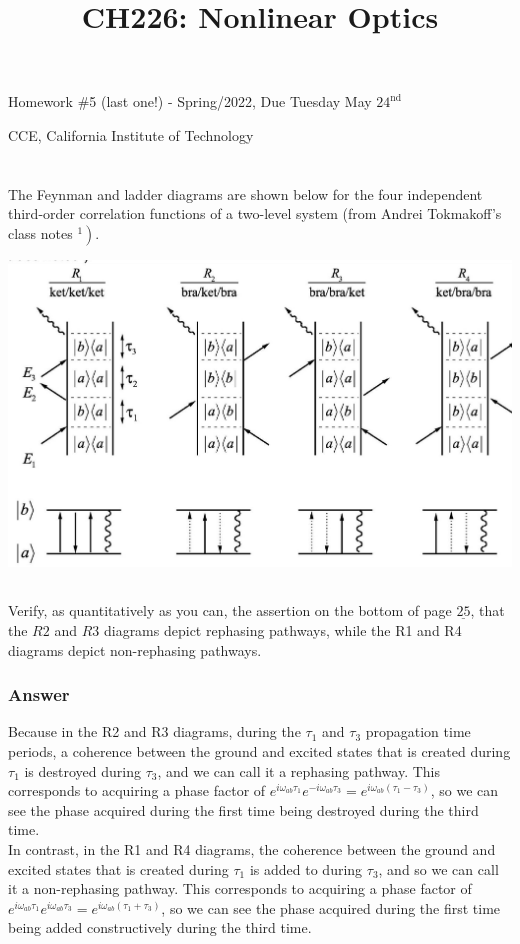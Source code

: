 \documentclass[12pt]{article}
\title{CH226: Nonlinear Optics }
\author{}
\date{}
\begin{document}
\maketitle
Homework \#5 (last one!) - Spring/2022, Due Tuesday May $24^{\text {nd }}$

CCE, California Institute of Technology

\section{}

The Feynman and ladder diagrams are shown below for the four independent third-order correlation functions of a two-level system (from Andrei Tokmakoff's class notes $\left.{ }^{1}\right)$.

\begin{center}
\includegraphics[max width=\textwidth]{2024_05_26_dcc5d1010257c1c9dfb7g-1}
\end{center}
\subsection{}

Verify, as quantitatively as you can, the assertion on the bottom of page $\underline{25}$, that the $R 2$ and $R 3$ diagrams depict rephasing pathways, while the R1 and R4 diagrams depict non-rephasing pathways.
\subsubsection{Answer}
Because in the R2 and R3 diagrams, during the $\tau_1$ and $\tau_3$ propagation time periods, a coherence between the ground and excited states that is created during $\tau_1$ is destroyed during $\tau_3$, and we can call it a rephasing pathway. This corresponds to acquiring a phase factor of $e^{i \omega_{ab} \tau_{1}} e^{-i \omega_{ab} \tau_{3}} = e^{i \omega_{ab}(\tau_{1}-\tau_{3})}$, so we can see the phase acquired during the first time being destroyed during the third time.\\
 In contrast, in the R1 and R4 diagrams, the coherence between the ground and excited states that is created during $\tau_1$ is added to during $\tau_3$, and so we can call it a non-rephasing pathway. This corresponds to acquiring a phase factor of $e^{i \omega_{ab} \tau_{1}} e^{i \omega_{ab} \tau_{3}} = e^{i \omega_{ab}(\tau_{1}+\tau_{3})}$, so we can see the phase acquired during the first time being added constructively during the third time.
\end{document}
